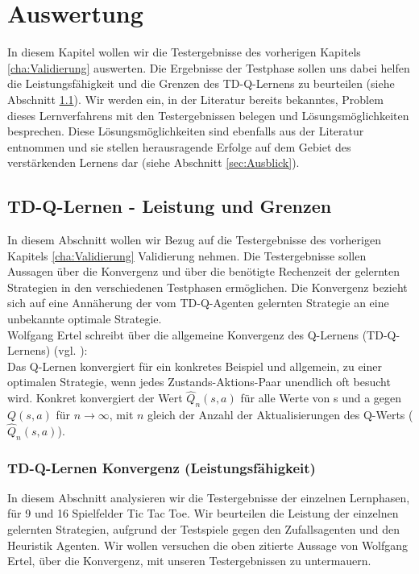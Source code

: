 \chapter{Auswertung}
\label{cha:Auswertung}
In diesem Kapitel wollen wir die Testergebnisse des vorherigen Kapitels \ref{cha:Validierung} auswerten. Die Ergebnisse der Testphase sollen uns dabei helfen die Leistungsfähigkeit und die Grenzen des TD-Q-Lernens zu beurteilen (siehe Abschnitt \ref{sec:TD-Q-Lernen - Leistung und Grenzen}). Wir werden ein, in der Literatur bereits bekanntes, Problem dieses Lernverfahrens mit den Testergebnissen belegen und Lösungsmöglichkeiten besprechen. Diese Lösungsmöglichkeiten sind ebenfalls aus der Literatur entnommen und sie stellen herausragende Erfolge auf dem Gebiet des verstärkenden Lernens dar (siehe Abschnitt \ref{sec:Ausblick}). \\

\section{TD-Q-Lernen - Leistung und Grenzen}
\label{sec:TD-Q-Lernen - Leistung und Grenzen}
In diesem Abschnitt wollen wir Bezug auf die Testergebnisse des vorherigen Kapitels \ref{cha:Validierung} Validierung nehmen. Die Testergebnisse sollen Aussagen über die Konvergenz und über die benötigte Rechenzeit der gelernten Strategien in den verschiedenen Testphasen ermöglichen. Die Konvergenz bezieht sich auf eine Annäherung der vom TD-Q-Agenten gelernten Strategie an eine unbekannte optimale Strategie. \\

Wolfgang Ertel schreibt über die allgemeine Konvergenz des Q-Lernens (TD-Q-Lernens) (vgl. \cite[299]{Ertel}): \\

Das Q-Lernen konvergiert für ein konkretes Beispiel und allgemein, zu einer optimalen Strategie, wenn jedes Zustands-Aktions-Paar unendlich oft besucht wird. Konkret konvergiert der Wert $\hat{Q}_n(s,a)$ für alle Werte von s und a gegen $Q(s,a)$ für $n \rightarrow \infty$, mit $n$ gleich der Anzahl der Aktualisierungen des Q-Werts ($\hat{Q}_n(s,a)$).

\subsection{TD-Q-Lernen Konvergenz (Leistungsfähigkeit)}
In diesem Abschnitt analysieren wir die Testergebnisse der einzelnen Lernphasen, für 9 und 16 Spielfelder Tic Tac Toe. Wir beurteilen die Leistung der einzelnen gelernten Strategien, aufgrund der Testspiele gegen den Zufallsagenten und den Heuristik Agenten. Wir wollen versuchen die oben zitierte Aussage von Wolfgang Ertel, über die Konvergenz, mit unseren Testergebnissen zu untermauern.  \\

